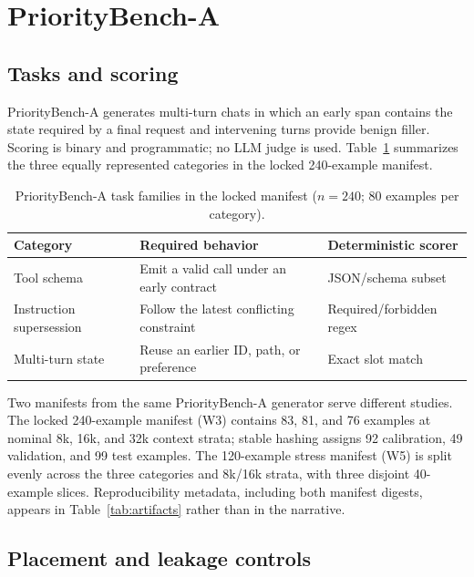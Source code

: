 \documentclass[10pt]{article}
\begin{document}
\section{PriorityBench-A}
\label{sec:benchmark}

\subsection{Tasks and scoring}
\label{sec:tasks}

PriorityBench-A generates multi-turn chats in which an early span contains the
state required by a final request and intervening turns provide benign filler.
Scoring is binary and programmatic; no LLM judge is used.  Table~\ref{tab:tasks}
summarizes the three equally represented categories in the locked 240-example
manifest.

\begin{table}[!htbp]
  \centering
  \caption{PriorityBench-A task families in the locked manifest ($n=240$;
  80 examples per category).}
  \label{tab:tasks}
  \begin{tabular}{lll}
    \toprule
    Category & Required behavior & Deterministic scorer \\
    \midrule
    Tool schema & Emit a valid call under an early contract & JSON/schema subset \\
    Instruction supersession & Follow the latest conflicting constraint & Required/forbidden regex \\
    Multi-turn state & Reuse an earlier ID, path, or preference & Exact slot match \\
    \bottomrule
  \end{tabular}
\end{table}

Two manifests from the same PriorityBench-A generator serve different studies.
The locked 240-example manifest (W3) contains 83, 81, and 76 examples at nominal
8k, 16k, and 32k context strata; stable hashing assigns 92 calibration, 49
validation, and 99 test examples.  The 120-example stress manifest (W5) is split
evenly across the three categories and 8k/16k strata, with three disjoint
40-example slices.  Reproducibility metadata, including both manifest digests,
appears in Table~\ref{tab:artifacts} rather than in the narrative.

\subsection{Placement and leakage controls}
\label{sec:controls}
\end{document}
